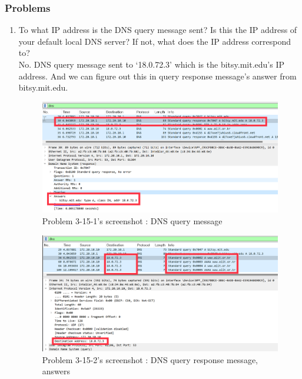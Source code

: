    \subsubsection*{Problems}
    \begin{enumerate}[label=\bfseries Problem \arabic*:,leftmargin=*,labelindent=1em]\addtocounter{enumi}{14}
        \item To what IP address is the DNS query message sent? 
        Is this the IP address of your default local DNS server? 
        If not, what does the IP address correspond to?\\[0.2mm]
            \soln No. DNS query message sent to ‘18.0.72.3’ which is the bitsy.mit.edu’s IP address. 
            And we can figure out this in query response message’s answer from bitsy.mit.edu.

            \begin{figure}[!h]\centering
        		\includegraphics[width=.79\textwidth]{image/result_week01/Q3-f-1.png}
        		\caption{\footnotesize Problem 3-15-1's screenshot : DNS query message}
        		\vspace{-10pt}
            \end{figure}
            \begin{figure}[!h]\centering
        		\includegraphics[width=.79\textwidth]{image/result_week01/Q3-f-2.png}
        		\caption{\footnotesize Problem 3-15-2's screenshot : DNS query response message, answers}

\end{figure}
\end{enumerate}
